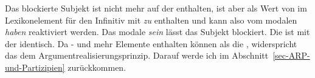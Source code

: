 {\noindent
Das blockierte Subjekt ist nicht mehr auf der \argst enthalten, ist aber als Wert von \subj im
Lexikonelement für den Infinitiv mit \emph{zu} enthalten und kann also vom modalen \emph{haben}
reaktiviert werden. Das modale \emph{sein} lässt das Subjekt blockiert. Die \compsl ist mit der \argstl identisch. Da \subj- und \compsl mehr Elemente
enthalten können als die \argstl, widerspricht das dem Argumentrealisierungsprinzip. Darauf werde
ich im Abschnitt~\ref{sec-ARP-und-Partizipien} zurückkommen.




}
